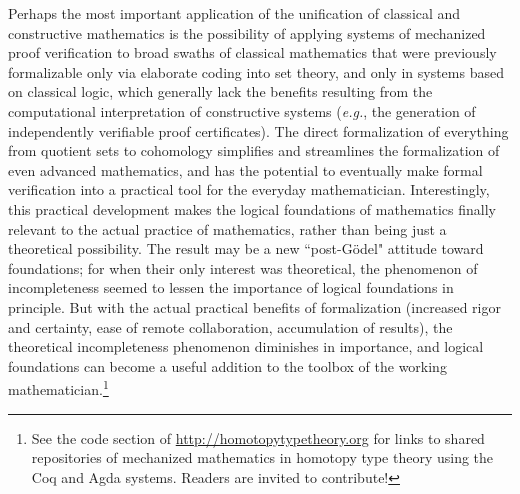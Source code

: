 \documentclass[11pt]{article}
\begin{document}
Perhaps the most important application of the unification of classical and constructive mathematics is the possibility
of applying systems of mechanized proof verification to broad swaths of classical mathematics that were previously
formalizable only via elaborate coding into set theory, and only in systems based on classical logic, which generally
lack the benefits resulting from the computational interpretation of constructive systems (\textit{e.g.}, the generation
of independently verifiable proof certificates).  The direct formalization of everything from quotient sets to
cohomology simplifies and streamlines the formalization of even advanced mathematics, and has the potential to
eventually make formal verification into a practical tool for the everyday mathematician.  Interestingly, this practical
development makes the logical foundations of mathematics finally relevant to the actual practice of mathematics, rather
than being just a theoretical possibility.  The result may be a new ``post-G\"odel" attitude toward foundations; for
when their only interest was theoretical, the phenomenon of incompleteness seemed to lessen the importance of logical
foundations in principle.  But with the actual practical benefits of formalization (increased rigor and certainty, ease
of remote collaboration, accumulation of results), the theoretical incompleteness phenomenon diminishes in importance,
and logical foundations can become a useful addition to the toolbox of the working mathematician.\footnote{See the code
  section of \url{http://homotopytypetheory.org} for links to shared repositories of mechanized mathematics in homotopy
  type theory using the Coq and Agda systems.  Readers are invited to contribute!}

\end{document}

